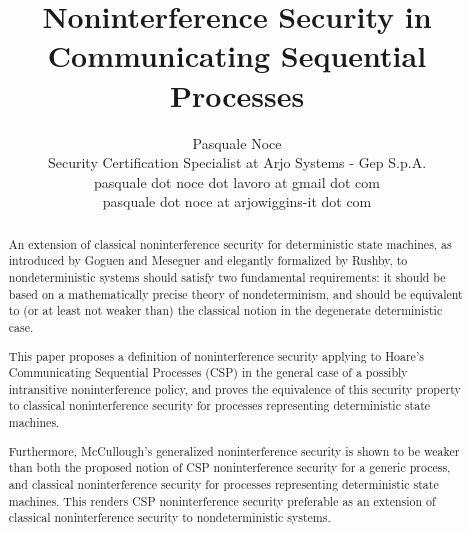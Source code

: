 \documentclass[11pt,a4paper]{article}
\begin{document}
\title{Noninterference Security in\\Communicating Sequential Processes}
\author{Pasquale Noce\\Security Certification Specialist at Arjo Systems - Gep S.p.A.\\pasquale dot noce dot lavoro at gmail dot com\\pasquale dot noce at arjowiggins-it dot com}
\maketitle

\begin{abstract}
An extension of classical noninterference security for deterministic state
machines, as introduced by Goguen and Meseguer and elegantly formalized by
Rushby, to nondeterministic systems should satisfy two fundamental requirements:
it should be based on a mathematically precise theory of nondeterminism, and
should be equivalent to (or at least not weaker than) the classical notion in
the degenerate deterministic case.

This paper proposes a definition of noninterference security applying to Hoare's
Communicating Sequential Processes (CSP) in the general case of a possibly
intransitive noninterference policy, and proves the equivalence of this security
property to classical noninterference security for processes representing
deterministic state machines.

Furthermore, McCullough's generalized noninterference security is shown to be
weaker than both the proposed notion of CSP noninterference security for a
generic process, and classical noninterference security for processes
representing deterministic state machines. This renders CSP noninterference
security preferable as an extension of classical noninterference security to
nondeterministic systems.
\end{abstract}

\tableofcontents





\end{document}
